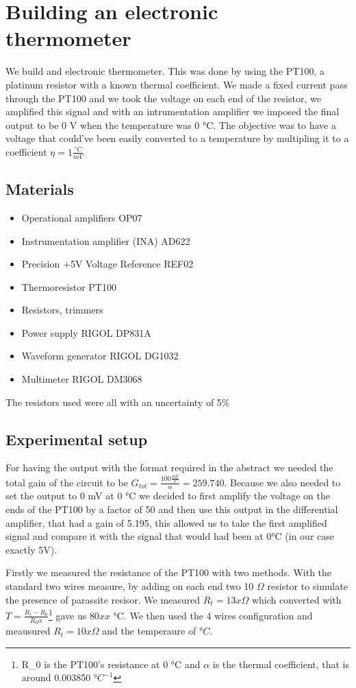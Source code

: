 \chapter{Building an electronic thermometer}
We build and electronic thermometer. This was done by using the PT100, a platinum resistor with a known thermal coefficient. We made a fixed current pass through the PT100 and we took the voltage on each end of the resistor, we amplified this signal and with an intrumentation amplifier we imposed the final output to be 0 V when the temperature was 0 °C. The objective was to have a voltage that could've been easily converted to a temperature by multipling it to a coefficient $\eta = 1 \frac{°C}{mV}$


\section{Materials}
\begin{itemize}
\item Operational amplifiers OP07
\item Instrumentation amplifier (INA) AD622
\item Precision +5V Voltage Reference REF02
\item Thermoresistor PT100
\item Resistors, trimmers
\item Power supply RIGOL DP831A
\item Waveform generator RIGOL DG1032
\item Multimeter RIGOL DM3068
\end{itemize}
The resistors used were all with an uncertainty of 5\%
\section{Experimental setup}
For having the output with the format required in the abstract we needed the total gain of the circuit to be $G_{tot} = \frac{100 \frac{mV}{°C}}{\alpha} = 259.740$. Because we also needed to set the output to 0 mV at 0 °C we decided to first amplify the voltage on the ends of the PT100 by a factor of 50 and then use this output in the differential amplifier, that had a gain of 5.195, this allowed us to take the first amplified signal and compare it with the signal that would had been at 0°C (in our case exactly 5V).


Firstly we measured the resistance of the PT100 with two methods. With the standard two wires measure, by adding on each end two 10 $\Omega$ resistor to simulate the presence of parassite resisor. We measured $R_t = 13x \Omega$ which converted with $T = \frac{R_t - R_0}{R_0 \alpha}$\footnote{R_0 is the PT100's resistance at 0 °C and $\alpha$ is the thermal coefficient, that is around 0.003850 $°C^{-1}$} gave us $80 xx$ °C. We then used the 4 wires configuration and meausured $R_t = 10x \Omega$ and the temperaure of  $ °C$.\\

